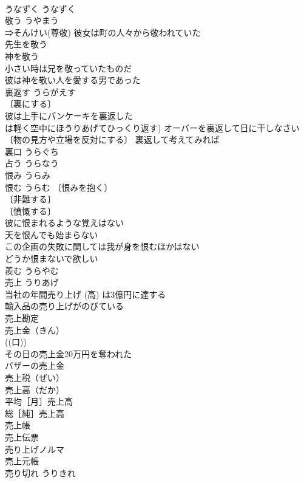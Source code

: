 \documentclass[8pt]{extreport}
\begin{document}
\begin{CJK}{UTF8}{min}
\\	うなずく	うなずく	
\\	敬う	うやまう	
\\	⇒そんけい(尊敬) 彼女は町の人々から敬われていた 
\\	先生を敬う 
\\	神を敬う 
\\	小さい時は兄を敬っていたものだ 
\\	彼は神を敬い人を愛する男であった 
\\	裏返す	うらがえす	
\\	〔裏にする〕
\\	彼は上手にパンケーキを裏返した 
\\	は軽く空中にほうりあげてひっくり返す) オーバーを裏返して日に干しなさい 
\\	〔物の見方や立場を反対にする〕 裏返して考えてみれば 
\\	裏口	うらぐち	
\\	占う	うらなう	
\\	恨み	うらみ	
\\	恨む	うらむ	〔恨みを抱く〕
\\	〔非難する〕
\\	〔憤慨する〕
\\	彼に恨まれるような覚えはない 
\\	天を恨んでも始まらない 
\\	この企画の失敗に関しては我が身を恨むほかはない 
\\	どうか恨まないで欲しい 
\\	羨む	うらやむ	
\\	売上	うりあげ	
\\	当社の年間売り上げ (高) は3億円に達する 
\\	輸入品の売り上げがのびている 
\\	売上勘定 
\\	売上金（きん） 
\\	((口)) 
\\	その日の売上金20万円を奪われた 
\\	バザーの売上金 
\\	売上税（ぜい） 
\\	売上高（だか） 
\\	平均［月］売上高 
\\	総［純］売上高 
\\	売上帳 
\\	売上伝票 
\\	売り上げノルマ 
\\	売上元帳 
\\	売り切れ	うりきれ	

\end{CJK}
\end{document}

